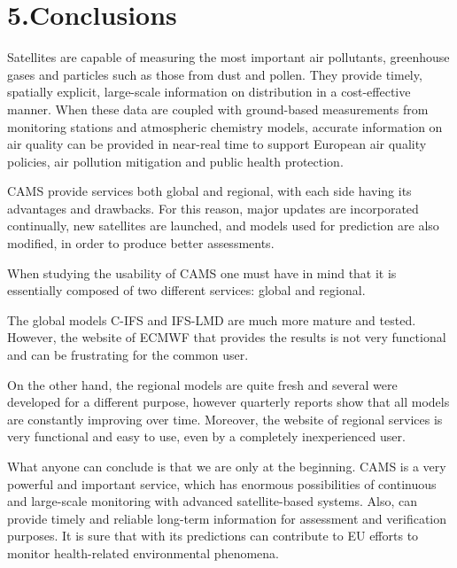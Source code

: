 \documentclass[9pt]{report}
\begin{document}
\section{5.\hspace*{0.5em}Conclusions}\label{sec-conclusions}%

\noindent{}Satellites are capable of measuring the most important air pollutants, greenhouse gases and particles such as those from dust and pollen. They provide timely, spatially explicit, large-scale information on distribution in a cost-effective manner. When these data are coupled with ground-based measurements from monitoring stations and atmospheric chemistry models, accurate information on air quality can be provided in near-real time to support European air quality policies, air pollution mitigation and public health protection.%

CAMS provide services both global and regional, with each side having its advantages and drawbacks. For this reason, major updates are incorporated continually, new satellites are launched, and models used for prediction are also modified, in order to produce better assessments.%

When studying the usability of CAMS one must have in mind that it is essentially composed of two different services: global and regional.%

The global models C-IFS and IFS-LMD are much more mature and tested. However, the website of ECMWF that provides the results is not very functional and can be frustrating for the common user.%

On the other hand, the regional models are quite fresh and several were developed for a different purpose, however quarterly reports show that all models are constantly improving over time.
Moreover, the website of regional services is very functional and easy to use, even by a completely inexperienced user.%

What anyone can conclude is that we are only at the beginning. CAMS is a very powerful and important service, which has enormous possibilities of continuous and large-scale monitoring with advanced satellite-based systems. Also, can provide timely and reliable long-term information for assessment and verification purposes. It is sure that with its predictions can contribute to EU efforts to monitor health-related environmental phenomena.%

{%
\begin{thebibliography}{0}%
\label{sec-bibliography}%
\par%
\end{thebibliography}}%
\end{document}
